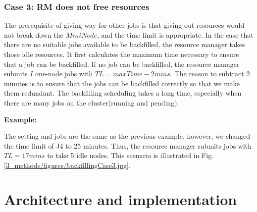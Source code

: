 \subsection{Case 3: RM does not free resources }

The prerequisite of giving way for other jobs is that giving out resources would not break down the $MiniNode$, and the time limit is appropriate.
In the case that there are no suitable jobs available to be backfilled, the resource manager takes those idle resources.
It first calculates the maximum time necessary to ensure that a job can be backfilled. If no job can be backfilled, the resource manager submits $I$ one-node jobs with $TL=maxTime-2mins$.
The reason to subtract 2 minutes is to ensure that the jobs can be backfilled correctly so that we make them redundant.
The backfilling scheduling takes a long time, especially when there are many jobs on the cluster(running and pending).

\textbf{Example:}

The setting and jobs are the same as the previous example, however, we changed the time limit of J4 to 25 minutes.
Thus, the resource manager submits jobs with $TL=17 mins$ to take 5 idle nodes. This scenario is illustrated in Fig. \ref{3_methods/figures/backfillingCase3.jpg}.




\ifpdf
    \graphicspath{{3_methods/figures/PNG/}{3_methods/figures/PDF/}{3_methods/figures/}}
\else
    \graphicspath{{3_methods/figures/EPS/}{3_methods/figures/}}
\fi


% 



\chapter{Architecture and implementation}\label{chapter:4} %

